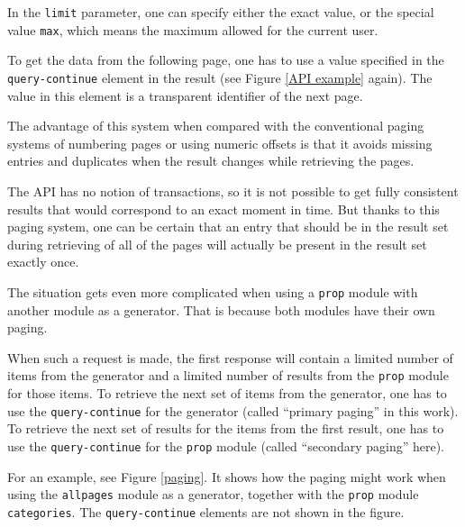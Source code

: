 In the \texttt{limit} parameter, one can specify either the exact value,
or the special value \texttt{max}, which means the maximum allowed for the current user.

To get the data from the following page, one has to use a value specified in the \texttt{query-continue}
element in the result (see Figure \ref{API example} again).
The value in this element is a transparent identifier of the next page.

The advantage of this system when compared with the conventional paging systems of numbering pages
or using numeric offsets is that it avoids missing entries and duplicates when the result
changes while retrieving the pages.

The API has no notion of transactions, so it is not possible to get fully consistent results
that would correspond to an exact moment in time.
But thanks to this paging system, one can be certain that an entry that should be in the result set
during retrieving of all of the pages will actually be present in the result set exactly once.

The situation gets even more complicated when using a \texttt{prop} module with another module as a generator.
That is because both modules have their own paging.

When such a request is made, the first response will contain a limited number of items from the generator
and a limited number of results from the \texttt{prop} module for those items.
To retrieve the next set of items from the generator, one has to use the \texttt{query-continue} for the generator
(called “primary paging” in this work).
To retrieve the next set of results for the items from the first result,
one has to use the \texttt{query-continue} for the \texttt{prop} module (called “secondary paging” here).

For an example, see Figure \ref{paging}.
It shows how the paging might work when using the \texttt{allpages} module as a generator,
together with the \texttt{prop} module \texttt{categories}.
The \texttt{query-continue} elements are not shown in the figure.


